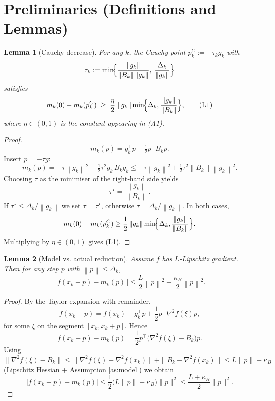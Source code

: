 \documentclass[11pt]{article}
\newtheorem{lemma}{Lemma}
\newcommand{\norm}[1]{\left\lVert#1\right\rVert}
\begin{document}
\section*{Preliminaries (Definitions and Lemmas)}
\begin{lemma}[Cauchy decrease]\label{lem:cauchy}
For any $k$, the Cauchy point $p_k^{C}:=-\tau_k g_k$ with
\[
\tau_k:=\min\!\Bigl\{\frac{\norm{g_k}}{\norm{B_k} \norm{g_k}},\;\frac{\Delta_k}{\norm{g_k}}\Bigr\}
\]
satisfies
\[
m_k(0)-m_k(p_k^{C}) \;\ge\; \frac{\eta}{2}\,\norm{g_k}\min\!\Bigl\{\Delta_k,\frac{\norm{g_k}}{\norm{B_k}}\Bigr\},
\tag{L1}
\]
where $\eta\in(0,1)$ is the constant appearing in (A1).
\end{lemma}
\begin{proof}
\[
m_k(p)=g_k^{\top}p+\tfrac12 p^{\top}B_k p .
\]
Insert $p=-\tau g$:
\[
m_k(p)=-\tau\norm{g_k}^{2}+\tfrac12\tau^{2} g_k^{\top}B_k g_k
\le -\tau\norm{g_k}^{2}+\tfrac12\tau^{2}\norm{B_k}\norm{g_k}^{2}.
\]
Choosing $\tau$ as the minimiser of the right‑hand side yields
\[
\tau^{\star}= \frac{\norm{g_k}}{\norm{B_k}} .
\]
If $\tau^{\star}\le\Delta_k/\norm{g_k}$ we set $\tau=\tau^{\star}$, otherwise $\tau=\Delta_k/\norm{g_k}$.
In both cases,
\[
m_k(0)-m_k(p_k^{C})\ge \frac12\norm{g_k}\min\!\Bigl\{\Delta_k,\frac{\norm{g_k}}{\norm{B_k}}\Bigr\}.
\]
Multiplying by $\eta\in(0,1)$ gives (L1). \qedhere
\end{proof}

\begin{lemma}[Model vs. actual reduction]\label{lem:ratio}
Assume $f$ has $L$‑Lipschitz gradient. Then for any step $p$ with $\norm{p}\le\Delta_k$,
\[
\bigl|\,f(x_k+p)-m_k(p)\,\bigr|
\le \frac{L}{2}\norm{p}^{2} + \frac{\kappa_B}{2}\norm{p}^{2}.
\tag{L2}
\]
\end{lemma}
\begin{proof}
By the Taylor expansion with remainder,
\[
f(x_k+p)=f(x_k)+g_k^{\top}p+\frac12 p^{\top}\nabla^{2}f(\xi)p,
\]
for some $\xi$ on the segment $[x_k,x_k+p]$. Hence
\[
f(x_k+p)-m_k(p)=\frac12 p^{\top}\bigl(\nabla^{2}f(\xi)-B_k\bigr)p .
\]
Using $\|\nabla^{2}f(\xi)-B_k\|\le \|\nabla^{2}f(\xi)-\nabla^{2}f(x_k)\|+\|B_k-\nabla^{2}f(x_k)\|
\le L\|p\|+\kappa_B$ (Lipschitz Hessian + Assumption \ref{as:model}) we obtain
\[
\bigl|f(x_k+p)-m_k(p)\bigr|
\le \frac12\bigl(L\|p\|+\kappa_B\bigr)\|p\|^{2}
\le \frac{L+\kappa_B}{2}\|p\|^{2}.
\]
\qedhere
\end{proof}
\end{document}
